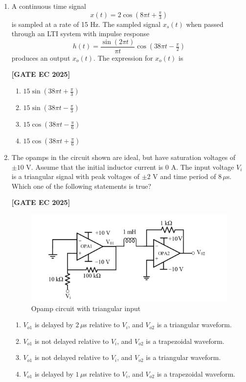 \documentclass[12pt]{article}
\begin{document}
\begin{enumerate}[leftmargin=1.5em, label=\textbf{Q.\arabic*}., itemsep=2em]
\item A continuous time signal
\[
x(t) = 2\cos(8\pi t + \tfrac{\pi}{3})
\]
is sampled at a rate of 15 Hz. The sampled signal $x_s(t)$ when passed through an LTI system with impulse response
\[
h(t) = \frac{\sin(2\pi t)}{\pi t}\cos(38\pi t - \tfrac{\pi}{2})
\]
produces an output $x_o(t)$. The expression for $x_o(t)$ is

\noindent \textbf{[GATE EC 2025]}
\begin{multicols}{2}
\begin{enumerate}
    \item $15 \sin(38\pi t + \tfrac{\pi}{3})$
    \item $15 \sin(38\pi t - \tfrac{\pi}{3})$
    \item $15 \cos(38\pi t - \tfrac{\pi}{6})$
    \item $15 \cos(38\pi t + \tfrac{\pi}{6})$
\end{enumerate}
\end{multicols}

\item The opamps in the circuit shown are ideal, but have saturation voltages of $\pm 10$ V. Assume that the initial inductor current is 0 A. The input voltage $V_i$ is a triangular signal with peak voltages of $\pm 2$ V and time period of $8\,\mu$s. Which one of the following statements is true?

\noindent \textbf{[GATE EC 2025]}
\begin{figure}[H]\centering
\includegraphics[width=0.65\columnwidth]{figs/q49.png}
\caption{Opamp circuit with triangular input}
\label{fig:q49}
\end{figure}
\begin{multicols}{2}
\begin{enumerate}
    \item $V_{o1}$ is delayed by $2\,\mu$s relative to $V_i$, and $V_{o2}$ is a triangular waveform.
    \item $V_{o1}$ is not delayed relative to $V_i$, and $V_{o2}$ is a trapezoidal waveform.
    \item $V_{o1}$ is not delayed relative to $V_i$, and $V_{o2}$ is a triangular waveform.
    \item $V_{o1}$ is delayed by $1\,\mu$s relative to $V_i$, and $V_{o2}$ is a trapezoidal waveform.
\end{enumerate}
\end{multicols}


\end{enumerate}
\end{document}
